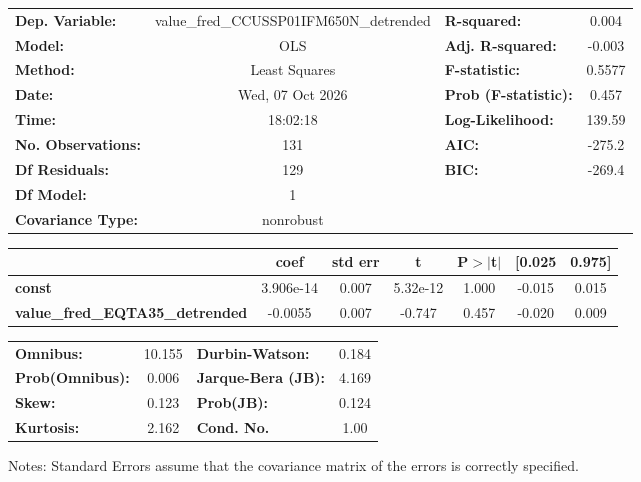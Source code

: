 \begin{center}
\begin{tabular}{lclc}
\toprule
\textbf{Dep. Variable:}                 & value\_fred\_CCUSSP01IFM650N\_detrended & \textbf{  R-squared:         } &     0.004   \\
\textbf{Model:}                         &                   OLS                   & \textbf{  Adj. R-squared:    } &    -0.003   \\
\textbf{Method:}                        &              Least Squares              & \textbf{  F-statistic:       } &    0.5577   \\
\textbf{Date:}                          &             Wed, 07 Oct 2026            & \textbf{  Prob (F-statistic):} &    0.457    \\
\textbf{Time:}                          &                 18:02:18                & \textbf{  Log-Likelihood:    } &    139.59   \\
\textbf{No. Observations:}              &                     131                 & \textbf{  AIC:               } &    -275.2   \\
\textbf{Df Residuals:}                  &                     129                 & \textbf{  BIC:               } &    -269.4   \\
\textbf{Df Model:}                      &                       1                 & \textbf{                     } &             \\
\textbf{Covariance Type:}               &                nonrobust                & \textbf{                     } &             \\
\bottomrule
\end{tabular}
\begin{tabular}{lcccccc}
                                        & \textbf{coef} & \textbf{std err} & \textbf{t} & \textbf{P$> |$t$|$} & \textbf{[0.025} & \textbf{0.975]}  \\
\midrule
\textbf{const}                          &    3.906e-14  &        0.007     &  5.32e-12  &         1.000        &       -0.015    &        0.015     \\
\textbf{value\_fred\_EQTA35\_detrended} &      -0.0055  &        0.007     &    -0.747  &         0.457        &       -0.020    &        0.009     \\
\bottomrule
\end{tabular}
\begin{tabular}{lclc}
\textbf{Omnibus:}       & 10.155 & \textbf{  Durbin-Watson:     } &    0.184  \\
\textbf{Prob(Omnibus):} &  0.006 & \textbf{  Jarque-Bera (JB):  } &    4.169  \\
\textbf{Skew:}          &  0.123 & \textbf{  Prob(JB):          } &    0.124  \\
\textbf{Kurtosis:}      &  2.162 & \textbf{  Cond. No.          } &     1.00  \\
\bottomrule
\end{tabular}
\end{center}

Notes: \newline
 [1] Standard Errors assume that the covariance matrix of the errors is correctly specified.